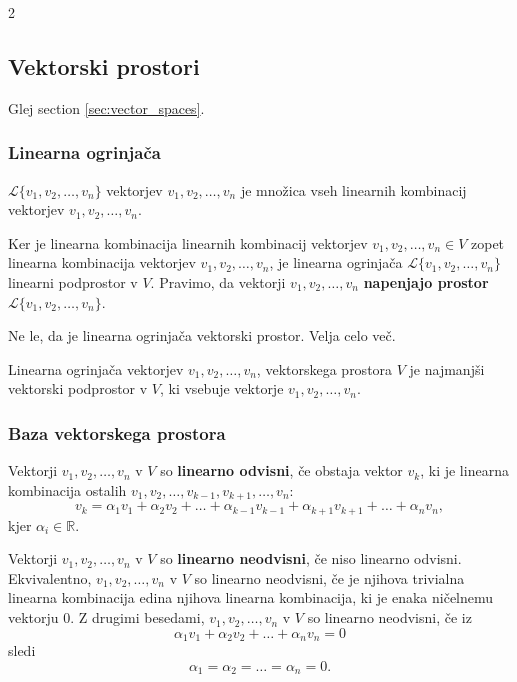 \documentclass{article}
\begin{document}
\begin{multicols}{2}
	\subsection{Vektorski prostori}
	Glej section \ref{sec:vector_spaces}.

	\subsubsection{Linearna ogrinjača} \( \mathcal{L}\{v_1, v_2, \ldots, v_n\} \) vektorjev \( v_1, v_2, \ldots, v_n \) je množica vseh linearnih kombinacij vektorjev \( v_1, v_2, \ldots, v_n \).

	Ker je linearna kombinacija linearnih kombinacij vektorjev \( v_1, v_2, \ldots, v_n \in V \) zopet linearna kombinacija vektorjev \( v_1, v_2, \ldots, v_n \), je linearna ogrinjača \( \mathcal{L}\{v_1, v_2, \ldots, v_n\} \) linearni podprostor v \( V \). Pravimo, da vektorji \( v_1, v_2, \ldots, v_n \) \textbf{napenjajo prostor} \( \mathcal{L}\{v_1, v_2, \ldots, v_n\} \).

	Ne le, da je linearna ogrinjača vektorski prostor. Velja celo več.

	Linearna ogrinjača vektorjev \( v_1, v_2, \ldots, v_n \), vektorskega prostora \( V \) je najmanjši vektorski podprostor v \( V \), ki vsebuje vektorje \( v_1, v_2, \ldots, v_n \).

	\subsubsection{Baza vektorskega prostora}

	Vektorji \( v_1, v_2, \ldots, v_n \) v \( V \) so \textbf{linearno odvisni}, če obstaja vektor \( v_k \), ki je linearna kombinacija ostalih \( v_1, v_2, \ldots, v_{k-1}, v_{k+1}, \ldots, v_n \):
	\[ v_k = \alpha_1v_1 + \alpha_2v_2 + \ldots + \alpha_{k-1}v_{k-1} + \alpha_{k+1}v_{k+1} + \ldots + \alpha_nv_n, \]
	kjer \( \alpha_i \in \mathbb{R} \).

	Vektorji \( v_1, v_2, \ldots, v_n \) v \( V \) so \textbf{linearno neodvisni}, če niso linearno odvisni. Ekvivalentno, \( v_1, v_2, \ldots, v_n \) v \( V \) so linearno neodvisni, če je njihova trivialna linearna kombinacija edina njihova linearna kombinacija, ki je enaka ničelnemu vektorju \( 0 \). Z drugimi besedami, \( v_1, v_2, \ldots, v_n \) v \( V \) so linearno neodvisni, če iz
	\[ \alpha_1v_1 + \alpha_2v_2 + \ldots + \alpha_nv_n = 0 \]
	sledi
	\[ \alpha_1 = \alpha_2 = \ldots = \alpha_n = 0. \]



\end{multicols}
\end{document}
